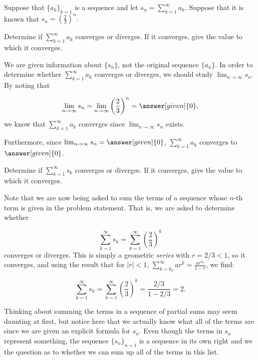\documentclass{ximera}
\begin{document}
\begin{example}
Suppose that $\{a_k\}_{k=1}$ is a sequence and let $s_n = \sum_{k=1}^{\infty} a_k$.  Suppose that it is known that $s_n = \left(\frac{2}{3}\right)^n.$

\begin{question}
Determine if $\sum_{k=1}^{\infty} a_k$ converges or diverges. If it converges, give the value to which it converges.

\begin{explanation}
We are given information about $\{s_n\}$, not the original sequence $\{a_n\}$.  In order to determine whether $\sum_{k=1}^{\infty} a_k$ converges or diverges, we should study $\lim_{n \to \infty} s_n$.  By noting that

\[
\lim_{n \to \infty} s_n = \lim_{n \to \infty} \left(\frac{2}{3}\right)^n = \answer[given]{0},
\]
we know that $\sum_{k=1}^{\infty} a_k$  converges since $\lim_{n \to \infty} s_n$ exists.  

Furthermore, since $\lim_{n \to \infty} s_n = \answer[given]{0}$, $\sum_{k=1}^{\infty} a_k$ converges to $\answer[given]{0}$.
\end{explanation}
\end{question}

\begin{question}
Determine if $\sum_{k=1}^{\infty} s_k$ converges or diverges. If it converges, give the value to which it converges.

\begin{explanation}
Note that we are now being asked to sum the terms of a sequence whose $n$-th term is given in the problem statement.  That is, we are asked to determine whether

\[
\sum_{k=1}^{\infty} s_k = \sum_{k=1}^{\infty} \left(\frac{2}{3}\right)^k
\]
converges or diverges.  This is simply a geometric \emph{series} with $r = 2/3 <1$, so it converges, and using the result that for $|r|<1$, $\sum_{k=k_0}^{\infty} ar^k = \frac{ar^{k_0}}{1-r}$, we find:

\[
\sum_{k=1}^{\infty} s_k = \sum_{k=1}^{\infty} \left(\frac{2}{3}\right)^k = \frac{2/3}{1-2/3} = 2.
\]

\begin{remark}
Thinking about summing the terms in a sequence of partial sums may seem daunting at first, but notice here that we actually know what all of the terms are since we are given an explicit formula for $s_n$.  Even though the terms in $s_n$ represent something, the sequence $\{s_n\}_{n=1}$ is a sequence in its own right and we the question as to whether we can sum up all of the terms in this list. 


\end{remark}
\end{explanation}
\end{question}
\end{example}
\end{document}
